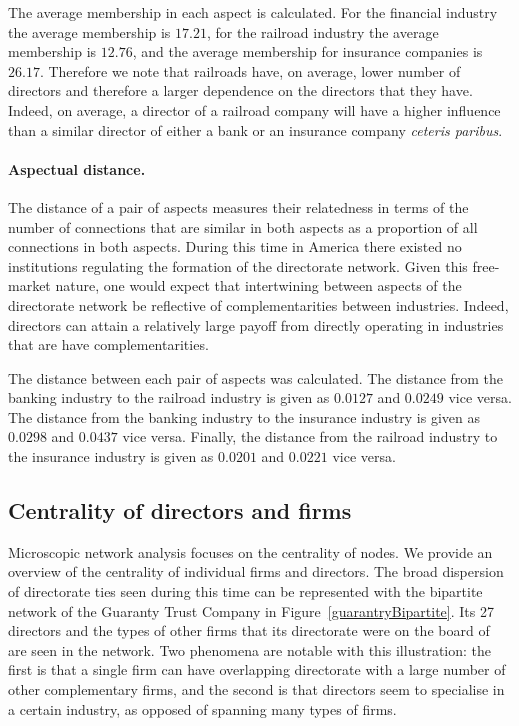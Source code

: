 The average membership in each aspect is calculated. For the financial industry the average membership is $17.21$, for the railroad industry the average membership is $12.76$, and the average membership for insurance companies is $26.17$. Therefore we note that railroads have, on average, lower number of directors and therefore a larger dependence on the directors that they have. Indeed, on average, a director of a railroad company will have a higher influence than a similar director of either a bank or an insurance company \emph{ceteris paribus}.

\paragraph{Aspectual distance.}

The distance of a pair of aspects measures their relatedness in terms of the number of connections that are similar in both aspects as a proportion of all connections in both aspects. During this time in America there existed no institutions regulating the formation of the directorate network. Given this free-market nature, one would expect that intertwining between aspects of the directorate network be reflective of complementarities between industries. Indeed, directors can attain a relatively large payoff from directly operating in industries that are have complementarities.

The distance between each pair of aspects was calculated. The distance from the banking industry to the railroad industry is given as $0.0127$ and $0.0249$ vice versa. The distance from the banking industry to the insurance industry is given as $0.0298$ and $0.0437$ vice versa. Finally, the distance from the railroad industry to the insurance industry is given as $0.0201$ and $0.0221$ vice versa.

\subsection{Centrality of directors and firms}

Microscopic network analysis focuses on the centrality of nodes. We provide an overview of the centrality of individual firms and directors. The broad dispersion of directorate ties seen during this time can be represented with the bipartite network of the Guaranty Trust Company in Figure~\ref{guarantryBipartite}. Its 27 directors and the types of other firms that its directorate were on the board of are seen in the network. Two phenomena are notable with this illustration: the first is that a single firm can have overlapping directorate with a large number of other complementary firms, and the second is that directors seem to specialise in a certain industry, as opposed of spanning many types of firms.

